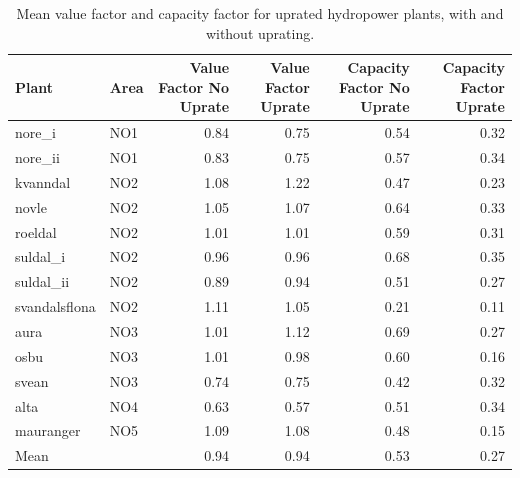 \begin{table}
\caption{Mean value factor and capacity factor for uprated hydropower plants, with and without uprating.}
\label{tab:uprated_plant_value_capacity_factors}
\begin{tabular}{llrrrr}
\toprule
Plant & Area & Value Factor No Uprate & Value Factor Uprate & Capacity Factor No Uprate & Capacity Factor Uprate \\
\midrule
nore_i & NO1 & 0.84 & 0.75 & 0.54 & 0.32 \\
nore_ii & NO1 & 0.83 & 0.75 & 0.57 & 0.34 \\
kvanndal & NO2 & 1.08 & 1.22 & 0.47 & 0.23 \\
novle & NO2 & 1.05 & 1.07 & 0.64 & 0.33 \\
roeldal & NO2 & 1.01 & 1.01 & 0.59 & 0.31 \\
suldal_i & NO2 & 0.96 & 0.96 & 0.68 & 0.35 \\
suldal_ii & NO2 & 0.89 & 0.94 & 0.51 & 0.27 \\
svandalsflona & NO2 & 1.11 & 1.05 & 0.21 & 0.11 \\
aura & NO3 & 1.01 & 1.12 & 0.69 & 0.27 \\
osbu & NO3 & 1.01 & 0.98 & 0.60 & 0.16 \\
svean & NO3 & 0.74 & 0.75 & 0.42 & 0.32 \\
alta & NO4 & 0.63 & 0.57 & 0.51 & 0.34 \\
mauranger & NO5 & 1.09 & 1.08 & 0.48 & 0.15 \\
\midrule
Mean &  & 0.94 & 0.94 & 0.53 & 0.27 \\
\bottomrule
\end{tabular}
\end{table}
